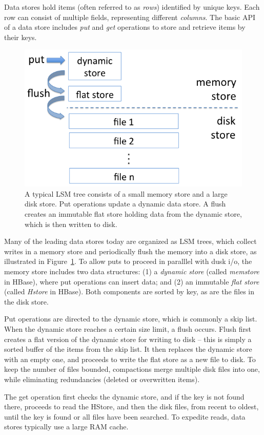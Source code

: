 Data stores hold items (often referred to as \emph{rows})
identified by unique keys. Each row can consist of multiple fields, representing different \emph{columns}.
The basic API of a data store includes \emph{put} and \emph{get} operations to store and retrieve items by their keys.

\begin{figure}[tbh]
\center
\includegraphics[width=0.85\columnwidth]{LSM} 
\caption{A typical LSM tree consists of a small memory store and a large disk store. 
Put operations update a dynamic data store. A flush creates an immutable flat store  holding 
data from the dynamic store, which is then written to disk.}
\label{fig:LSM}
\end{figure}

Many of the leading data stores today are organized as LSM trees, which collect writes in a memory store 
and periodically flush the memory into a disk store, as illustrated in Figure~\ref{fig:LSM}. 
To allow puts to proceed in paralllel with dusk i/o, the memory store includes two data structures:
(1) a \emph{dynamic store} (called \emph{memstore} in HBase), where put operations can insert data; and  
(2) an immutable \emph{flat store} (called \emph{Hstore} in HBase).
Both components are sorted by key, as are the files in the disk store. 

Put operations are directed to the dynamic store, which is commonly a skip list.
When the dynamic store reaches a certain size limit, a flush occurs. 
Flush first creates a flat version of the dynamic store for writing to disk -- this is simply a sorted buffer of the items from the skip list.  
It then replaces the dynamic store with an empty one, and proceeds to write the flat store as a new file to disk.
 To keep the number of files bounded, compactions merge multiple disk files into one, while eliminating redundancies 
 (deleted or overwritten items). 

The get operation first checks the dynamic store, and if the key is not found there, proceeds to read the HStore, and 
then the disk files, from recent to oldest, until the key is found or all files have been searched. 
To expedite reads, data stores typically use a large RAM cache. 
